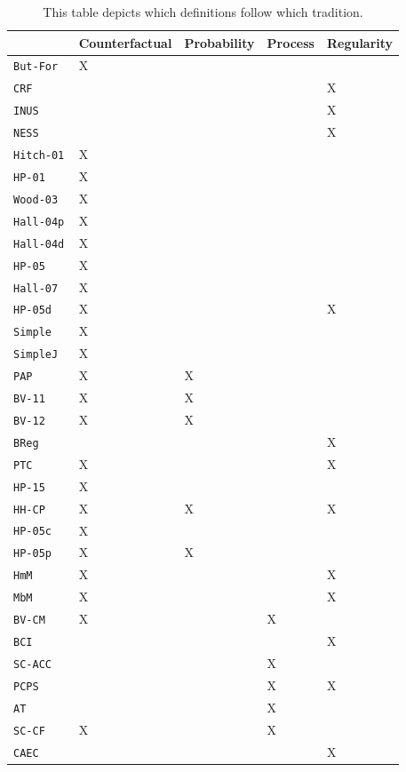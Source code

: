 \documentclass[11pt,a4paper]{book}
\theoremstyle{definition}
\theoremstyle{definition}
\theoremstyle{definition}
\theoremstyle{remark}
\newcommand{\butfor}{\texttt{But-For}\,}
\newcommand{\crf}{\texttt{CRF}\,}
\newcommand{\inus}{\texttt{INUS}\,}
\newcommand{\ness}{\texttt{NESS}\,}
\newcommand{\hitch}{\texttt{Hitch-01}\,}
\newcommand{\hpo}{\texttt{HP-01}\,}
\newcommand{\wood}{\texttt{Wood-03}\,}
\newcommand{\hallp}{\texttt{Hall-04p}\,}
\newcommand{\halld}{\texttt{Hall-04d}\,}
\newcommand{\hpu}{\texttt{HP-05}\,}
\newcommand{\hall}{\texttt{Hall-07}\,}
\newcommand{\hpud}{\texttt{HP-05d}\,}
\newcommand{\simple}{\texttt{Simple}\,}
\newcommand{\simplej}{\texttt{SimpleJ}\,}
\newcommand{\pap}{\texttt{PAP}\,}
\newcommand{\bvo}{\texttt{BV-11}\,}
\newcommand{\bvu}{\texttt{BV-12}\,}
\newcommand{\breg}{\texttt{BReg}\,}
\newcommand{\ptc}{\texttt{PTC}\,}
\newcommand{\hpm}{\texttt{HP-15}\,}
\newcommand{\hhcp}{\texttt{HH-CP}\,}
\newcommand{\hpuc}{\texttt{HP-05c}\,}
\newcommand{\hpup}{\texttt{HP-05p}\,}
\newcommand{\hmm}{\texttt{HmM}\,}
\newcommand{\mbm}{\texttt{MbM}\,}
\newcommand{\bvcm}{\texttt{BV-CM}\,}
\newcommand{\bci}{\texttt{BCI}\,}
\newcommand{\scacc}{\texttt{SC-ACC}\,}
\newcommand{\pcps}{\texttt{PCPS}\,}
\newcommand{\at}{\texttt{AT}\,}
\newcommand{\sccf}{\texttt{SC-CF}\,}
\newcommand{\caec}{\texttt{CAEC}\,}
\begin{document}
\begin{table}
\centering
\scriptsize
\begin{tabular}{lllll}
\toprule
	 & Counterfactual	 & Probability	 & Process	 & Regularity	\\
	 \midrule
\butfor	& X	& 	& 	& 	\\
\crf	& 	& 	& 	& X	\\
\inus	& 	& 	& 	& X	\\
\ness	& 	& 	& 	& X	\\
\hitch	& X	& 	& 	& 	\\
\hpo	& X	& 	& 	& 	\\
\wood	& X	& 	& 	& 	\\
\hallp	& X	& 	& 	& 	\\
\halld	& X	& 	& 	& 	\\
\hpu	& X	& 	& 	& 	\\
\hall	& X	& 	& 	& 	\\
\hpud	& X	& 	& 	& X	\\
\simple	& X	& 	& 	& 	\\
\simplej	& X	& 	& 	& 	\\
\pap	& X	& X	& 	& 	\\
\bvo	& X	& X	& 	& 	\\
\bvu	& X	& X	& 	& 	\\
\breg	& 	& 	& 	& X	\\
\ptc	& X	& 	& 	& X	\\
\hpm	& X	& 	& 	& 	\\
\hhcp	& X	& X	& 	& X	\\
\hpuc	& X	& 	& 	& 	\\
\hpup	& X	& X	& 	& 	\\
\hmm	& X	& 	& 	& X	\\
\mbm	& X	& 	& 	& X	\\
\bvcm	& X	& 	& X	& 	\\
\bci	& 	& 	& 	& X	\\
\scacc	& 	& 	& X	& 	\\
\pcps	& 	& 	& X	& X	\\
\at	& 	& 	& X	& 	\\
\sccf	& X	& 	& X	& 	\\
\caec	& 	& 	& 	& X	\\

\bottomrule
\end{tabular}
\caption{This table depicts which definitions follow which tradition.}
\label{tab:definition_traditions}
\end{table}
\end{document}
